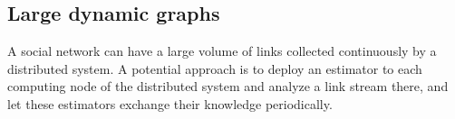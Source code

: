 \documentclass[12pt]{WSUThesis}
\theoremstyle{definition}
\begin{document}
\subsection{Large dynamic graphs}
A social network can have a large volume of links collected continuously by a
distributed system.
A potential approach is to deploy an estimator to each computing node of
the distributed system and analyze a link stream there,
and let these estimators exchange their knowledge periodically.

\newpage

\let\WriteBookmarks\relax
{}


\end{document}

